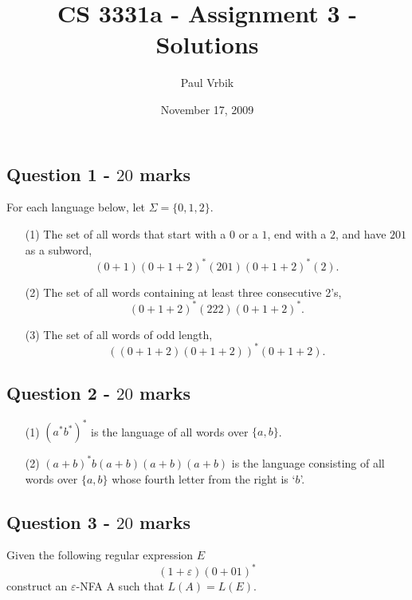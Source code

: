 \documentclass[12pt]{article}
\title{CS 3331a - Assignment 3 - Solutions}
\author{Paul Vrbik}
\date{November 17, 2009}
\begin{document}
 
\ShowFrame %

\maketitle
\subsection*{Question 1 - $20$ marks}
For each language below, let $\Sigma = \{ 0, 1, 2 \}$.
\begin{enumerate}
\item[(1)] The set of all words that start with a $0$ or a $1$, end with a $2$, and have $201$ as a subword,
$$(0+1)(0+1+2)^*(201)(0+1+2)^*(2).$$
\item[(2)] The set of all words containing at least three consecutive 2's,
$$(0+1+2)^*(222)(0+1+2)^*.$$
\item[(3)] The set of all words of odd length,
$$((0+1+2)(0+1+2))^*(0+1+2).$$
\end{enumerate}

\subsection*{Question 2 - $20$ marks}
\begin{enumerate}
\item[(1)] $(a^*b^*)^*$ is the language of all words over $\{a,b\}$.
\item[(2)] $(a+b)^*b(a+b)(a+b)(a+b)$ is the language consisting of all words over $\{a,b\}$ whose fourth letter from the right is `$b$'.
\end{enumerate}

\subsection*{Question 3 - $20$ marks}
Given the following regular expression $E$
$$(1+\varepsilon)(0+01)^*$$
construct an $\varepsilon$-NFA A such that $L(A) = L(E)$.
\end{document}
